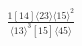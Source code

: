 \documentclass[varwidth, border=5pt]{standalone}
\begin{document}
\begin{my}
$\begin{gathered}
\scriptscriptstyle\frac{1[14]⟨23⟩⟨15⟩^2}{⟨13⟩^3[15]⟨45⟩}
\end{gathered}$
\end{my}
\end{document}
